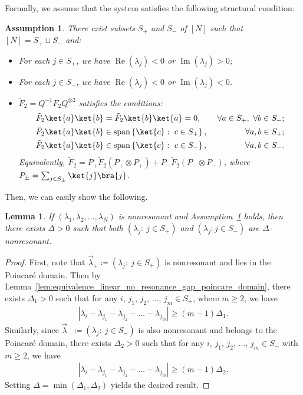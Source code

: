 \documentclass[superscriptaddress,onecolumn,nofootinbib,longbibliography,a4paper,accepted=2026-09-29]{quantumarticle}
\theoremstyle{plain}
\newtheorem{assumption}[thm]{Assumption}
\newtheorem{lemma}[thm]{Lemma}
\theoremstyle{definition}
\numberwithin{thm}{section}
\numberwithin{assumption}{section}
\numberwithin{lemma}{section}
\numberwithin{prop}{section}
\numberwithin{cor}{section}
\numberwithin{definition}{section}
\numberwithin{rmk}{section}
\numberwithin{equation}{section}
\newcommand{\abs}[1]      {\left| #1 \right|}
\newcommand{\lrb}[1]{\left ( #1 \right )}
\newcommand{\lrcb}[1]{\left \{ #1 \right \}}
\newcommand{\defeq}{\coloneqq}
\newcommand{\realpart}[1]{\operatorname{Re}\lrb{#1}}
\newcommand{\imaginarypart}[1]{\operatorname{Im}\lrb{#1}}
\newcommand{\myspan}[1]{\operatorname{span}\lrcb{#1}}
\newcommand{\mymin}[1]{\operatorname{min}\lrb{#1}}
\begin{document}
Formally, we assume that the system satisfies the following structural condition:
\begin{assumption}
There exist subsets $S_+$ and $S_-$ of $[N]$ such that $[N]=S_+\sqcup S_-$ and:
\begin{itemize}
    \item For each $j \in S_+$, we have $\realpart{\lambda_j} < 0$ or $\imaginarypart{\lambda_j} > 0$;
    \item For each $j \in S_-$, we have $\realpart{\lambda_j} < 0$ or $\imaginarypart{\lambda_j} < 0$.    
    \item $\tilde{F}_2=Q^{-1} F_2 Q^{\otimes 2}$ satisfies the conditions:
    \begin{align}
        \tilde{F}_2 \ket{a}\ket{b} &= \tilde{F}_2 \ket{b}\ket{a} = 0, ~&\forall a \in S_+, ~\forall b \in S_-; \\
        \tilde{F}_2 \ket{a}\ket{b} &\in \myspan{\ket{c}:~c \in S_+}, ~&\forall a,b \in S_+;  \\    
        \tilde{F}_2 \ket{a}\ket{b} &\in 
        \myspan{\ket{c}:~c \in S_-}, ~&\forall a,b \in S_-.         
    \end{align} 
    Equivalently, $\tilde{F}_2=P_+\tilde{F}_2(P_+\otimes P_+) + P_-\tilde{F}_2(P_-\otimes P_-)$, where $P_{\pm}=\sum_{j \in S_{\pm}} \ket{j}\bra{j}$.
\end{itemize}
\label{assump:block_diagonal_f2}
\end{assumption}
Then, we can easily show the following.
\begin{lemma}
If $(\lambda_1,\lambda_2,\dots,\lambda_N)$ is nonresonant and Assumption~\ref{assump:block_diagonal_f2} holds, then there exists $\Delta > 0$ such that
both $(\lambda_j:~j \in S_+)$ and $(\lambda_j:j \in S_-)$ are $\Delta$-nonresonant.
\label{lem:delta_constant_diagonal_f2}
\end{lemma}
\begin{proof}
First, note that $\vec\lambda_+\defeq (\lambda_j:~j \in S_+)$ is nonresonant and lies in the Poincar\'{e} domain. Then by Lemma~\ref{lem:equivalence_linear_no_resonance_gap_poincare_domain}, there exists $\Delta_1>0$ such that
for any $i$, $j_1$, $j_2$, $\dots$, $j_m \in S_+$, where $m \ge 2$, we have
\begin{align}
\abs{\lambda_i-\lambda_{j_1}-\lambda_{j_2}-\dots-\lambda_{j_m}} \ge (m-1)\Delta_1.    
\end{align}
Similarly, since $\vec\lambda_-\defeq (\lambda_j:~j \in S_-)$ is also nonresonant and belongs to the Poincar\'{e} domain, there exists $\Delta_2>0$ such that
for any $i$, $j_1$, $j_2$, $\dots$, $j_m \in S_-$ with $m \ge 2$, we have 
\begin{align}
\abs{\lambda_i-\lambda_{j_1}-\lambda_{j_2}-\dots-\lambda_{j_m}} \ge (m-1)\Delta_2.    
\end{align}
Setting $\Delta=\mymin{\Delta_1, \Delta_2}$ yields the desired result.     
\end{proof}
\end{document}
